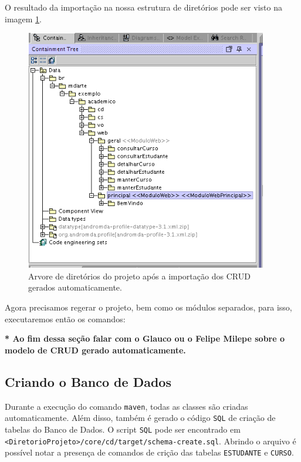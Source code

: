 \begin{enumerate}
O resultado da importação na nossa estrutura de diretórios pode ser visto na
imagem \ref{resultado_arvore_diretórios}.
\begin{figure}[H]
	\centering
	\includegraphics[width=300pt,height=300pt]{imgs/tutorial-mdarte-0019.png}
	\caption{Arvore de diretórios do projeto após a importação dos CRUD gerados
	automaticamente.}
	\label{resultado_arvore_diretórios}
\end{figure} 

Agora precisamos regerar o projeto, bem como os módulos separados, para isso,
executaremos então os comandos:
	
\begin{framed}
	
\end{framed}

\end{enumerate}

\textbf{* Ao fim dessa seção falar com o Glauco ou o Felipe Milepe sobre o
modelo de CRUD gerado automaticamente.}

\subsection{Criando o Banco de Dados}

Durante a execução do comando \texttt{maven}, todas as classes são criadas
automaticamente. Além disso, também é gerado o código \texttt{SQL} de criação de
tabelas do Banco de Dados. O script \texttt{SQL} pode ser encontrado em
\texttt{<DiretorioProjeto>/core/cd/target/schema-create.sql}. Abrindo o arquivo
é possível notar a presença de comandos de crição das tabelas \texttt{ESTUDANTE}
e \texttt{CURSO}.

